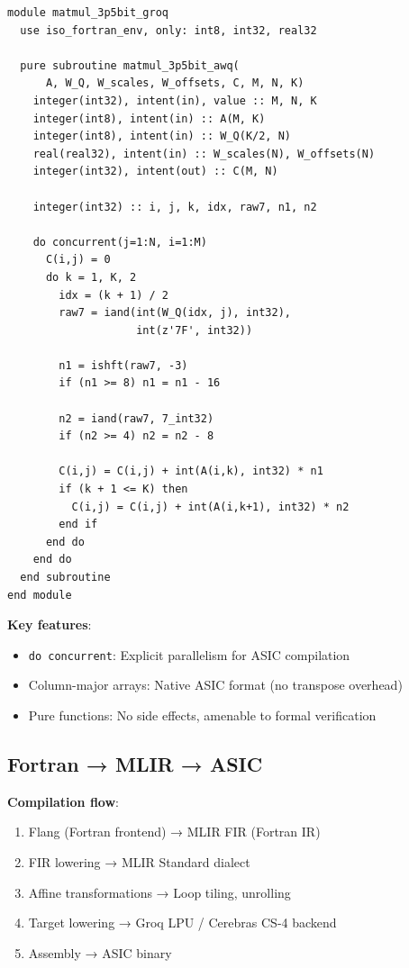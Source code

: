 \documentclass{article}
\begin{document}
\begin{verbatim}
module matmul_3p5bit_groq
  use iso_fortran_env, only: int8, int32, real32

  pure subroutine matmul_3p5bit_awq(
      A, W_Q, W_scales, W_offsets, C, M, N, K)
    integer(int32), intent(in), value :: M, N, K
    integer(int8), intent(in) :: A(M, K)
    integer(int8), intent(in) :: W_Q(K/2, N)
    real(real32), intent(in) :: W_scales(N), W_offsets(N)
    integer(int32), intent(out) :: C(M, N)

    integer(int32) :: i, j, k, idx, raw7, n1, n2

    do concurrent(j=1:N, i=1:M)
      C(i,j) = 0
      do k = 1, K, 2
        idx = (k + 1) / 2
        raw7 = iand(int(W_Q(idx, j), int32),
                    int(z'7F', int32))

        n1 = ishft(raw7, -3)
        if (n1 >= 8) n1 = n1 - 16

        n2 = iand(raw7, 7_int32)
        if (n2 >= 4) n2 = n2 - 8

        C(i,j) = C(i,j) + int(A(i,k), int32) * n1
        if (k + 1 <= K) then
          C(i,j) = C(i,j) + int(A(i,k+1), int32) * n2
        end if
      end do
    end do
  end subroutine
end module
\end{verbatim}

\textbf{Key features}:
\begin{itemize}
    \item \texttt{do concurrent}: Explicit parallelism for ASIC compilation
    \item Column-major arrays: Native ASIC format (no transpose overhead)
    \item Pure functions: No side effects, amenable to formal verification
\end{itemize}

\subsection{Fortran → MLIR → ASIC}

\textbf{Compilation flow}:
\begin{enumerate}
    \item Flang (Fortran frontend) → MLIR FIR (Fortran IR)
    \item FIR lowering → MLIR Standard dialect
    \item Affine transformations → Loop tiling, unrolling
    \item Target lowering → Groq LPU / Cerebras CS-4 backend
    \item Assembly → ASIC binary
\end{enumerate}
\end{document}
